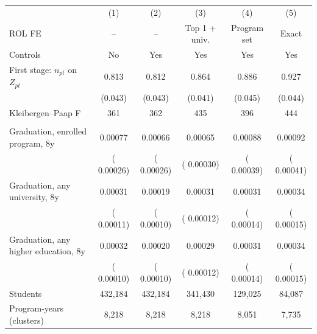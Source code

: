 \begin{tabular}{lccccc}
\toprule
 & (1) & (2) & (3) & (4) & (5) \\
ROL FE & -- & -- & Top 1 + univ. & Program set & Exact \\
Controls & No & Yes & Yes & Yes & Yes \\
\midrule
First stage: \(n_{pt}\) on \(Z_{pt}\) &  0.813\sym{***} &  0.812\sym{***} &  0.864\sym{***} &  0.886\sym{***} &  0.927\sym{***} \\
 & (0.043) & (0.043) & (0.041) & (0.045) & (0.044) \\
Kleibergen--Paap F &    361 &    362 &    435 &    396 &    444 \\
\addlinespace
\multicolumn{6}{l}{2SLS} \\
\quad Graduation, enrolled program, 8y &  0.00077\sym{***} &  0.00066\sym{**} &  0.00065\sym{**} &  0.00088\sym{**} &  0.00092\sym{**} \\
 & ( 0.00026) & ( 0.00026) & ( 0.00030) & ( 0.00039) & ( 0.00041) \\
\quad Graduation, any university, 8y &  0.00031\sym{***} &  0.00019\sym{*} &  0.00031\sym{**} &  0.00031\sym{**} &  0.00034\sym{**} \\
 & ( 0.00011) & ( 0.00010) & ( 0.00012) & ( 0.00014) & ( 0.00015) \\
\quad Graduation, any higher education, 8y &  0.00032\sym{***} &  0.00020\sym{**} &  0.00029\sym{**} &  0.00031\sym{**} &  0.00034\sym{**} \\
 & ( 0.00010) & ( 0.00010) & ( 0.00012) & ( 0.00014) & ( 0.00015) \\
\midrule
Students &   432,184 &   432,184 &   341,430 &   129,025 &    84,087 \\
Program-years (clusters) &  8,218 &  8,218 &  8,218 &  8,051 &  7,735 \\
\bottomrule
\end{tabular}
